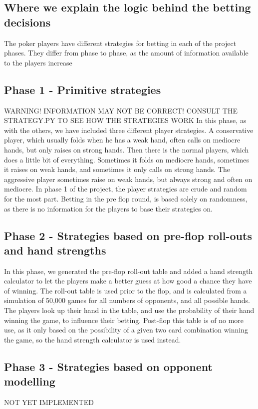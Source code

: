 \documentclass[titlepage]{article}
\begin{document}
\begin{itemize}
\section{Where we explain the logic behind the betting decisions}
	The poker players have different strategies for betting in each of the project phases. They differ from phase to phase, as the amount of information available to the players increase
	
	\subsection{Phase 1 - Primitive strategies}
		WARNING! INFORMATION MAY NOT BE CORRECT! CONSULT THE STRATEGY.PY TO SEE HOW THE 	STRATEGIES WORK
In this phase, as with the others, we have included three different player strategies. A 		conservative player, which usually folds when he has a weak hand, often calls on mediocre hands, 	but only raises on strong hands. Then there is the normal players, which does a little bit of 		everything. Sometimes it folds on mediocre hands, sometimes it raises on weak hands, and 		sometimes it only calls on strong hands. The aggressive player sometimes raise on weak hands, but always strong and often on mediocre. In phase 1 of the project, the player strategies are crude and random for the most part. Betting 	in the pre flop round, is based solely on randomness, as there is no information for the players to base their strategies on. 
	
	\subsection{Phase 2 - Strategies based on pre-flop roll-outs and hand strengths}
		In this phase, we generated the pre-flop roll-out table and added a hand strength calculator to let the players make a better guess at how good a chance they have of winning. The roll-out table is used prior to the flop, and is calculated from a simulation of 50,000 games for all numbers of opponents, and all possible hands. The players look up their hand in the table, and use the probability of their hand winning the game, to influence their betting. Post-flop this table is of no more use, as it only based on the possibility of a given two card combination winning the game, so the hand strength calculator is used instead. 
		
	\subsection{Phase 3 - Strategies based on opponent modelling}
		NOT YET IMPLEMENTED
		

\end{itemize}
\end{document}
